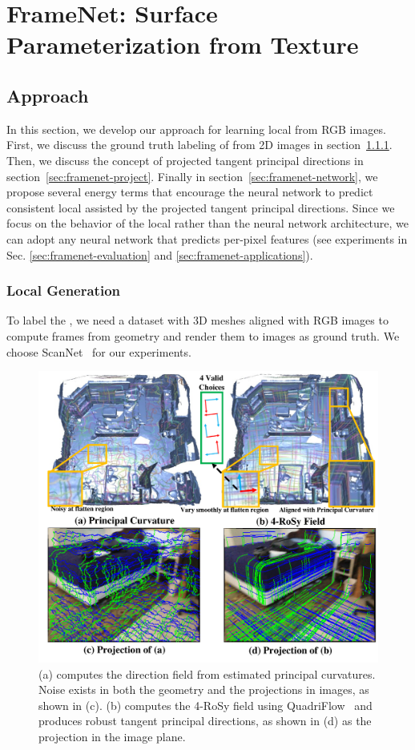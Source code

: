 \section{FrameNet: Surface Parameterization from Texture}
\label{sec:framenet}
\subsection{Approach}
In this section, we develop our approach for learning local \cframe{} from RGB images. First, we discuss the ground truth labeling of \cframe{} from 2D images in section~\ref{sec:framenet-prepare-data}. Then, we discuss the concept of projected tangent principal directions in section~\ref{sec:framenet-project}. Finally in section~\ref{sec:framenet-network}, we propose several energy terms that encourage the neural network to predict consistent local \cframe{} assisted by the projected tangent principal directions. Since we focus on the behavior of the local \cframe{} rather than the neural network architecture, we can adopt any neural network that predicts per-pixel features (see experiments in Sec. \ref{sec:framenet-evaluation} and \ref{sec:framenet-applications}).

\subsubsection{Local \ccff{} Generation}
\label{sec:framenet-prepare-data}
To label the \cframe, we need a dataset with 3D meshes aligned with RGB images to compute frames from geometry and render them to images as ground truth. We choose ScanNet~\cite{dai2017scannet} for our experiments.

\begin{figure}
    \centering
    \includegraphics[width=0.8\linewidth,height=0.584\linewidth]{FrameNet/graph/4rosy.pdf}
    \vspace{-0.20in}
    \caption{(a) computes the direction field from estimated principal curvatures. Noise exists in both the geometry and the projections in images, as shown in (c). (b) computes the 4-RoSy field using QuadriFlow~\cite{huang2018quadriflow} and produces robust tangent principal directions, as shown in (d) as the projection in the image plane.}
    \label{fig:framenet-vis-geometry}
\vspace{-0.1in}
\end{figure}

